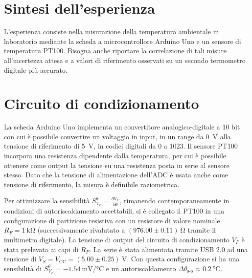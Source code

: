 \documentclass{article}
\begin{document}
\section{Sintesi dell'esperienza}
L'esperienza consiste nella misurazione della temperatura ambientale in laboratorio mediante la scheda a microcontrollore Arduino Uno e un sensore di temperatura PT100. Bisogna anche riportare la correlazione di tali misure all'incertezza attesa e a valori di riferimento osservati su un secondo termometro digitale più accurato.

\section{Circuito di condizionamento}
La scheda Arduino Uno implementa un convertitore analogico-digitale a 10 bit con cui è possibile convertire un voltaggio in input, in un range da \SI{0}{\volt} alla tensione di riferimento di \SI{5}{\volt}, in codici digitali da 0 a 1023. 
Il sensore PT100 incorpora una resistenza dipendente dalla temperatura, per cui è possibile ottenere come output la tensione su una resistenza posta in serie al sensore stesso.
Dato che la tensione di alimentazione dell'ADC è usata anche come tensione di riferimento, la misura è definibile raziometrica.

Per ottimizzare la sensibilità $S_{V_F}^{\theta}=\frac{\partial{V_F}}{\partial{\theta}}$, rimanendo contemporaneamente in condizioni di autoriscaldamento accettabili, si è collegato il PT100 in una configurazione di partizione resistiva con un resistore di valore nominale $R_F=\SI{1}{\kilo\ohm}$ (successivamente rivalutato a $(976.00\pm0.11)\SI{}{\ohm}$ tramite il multimetro digitale). La tensione di output del circuito di condizionamento $V_F$ è stata prelevata ai capi di $R_F$.
La serie è stata alimentata tramite USB 2.0 ad una tensione di $V_S=V_\text{CC}=(5.00\pm0.25)\SI{}{\volt}$.
Con questa configurazione si ha una sensibilità di $S_{V_F}^{\theta}=\SI{-1.54}{\milli\volt\per\celsius}$ e un autoriscaldamento $\Delta\theta_{\text{s-o}}\approx\SI{0.2}{\celsius}$.
\end{document}
